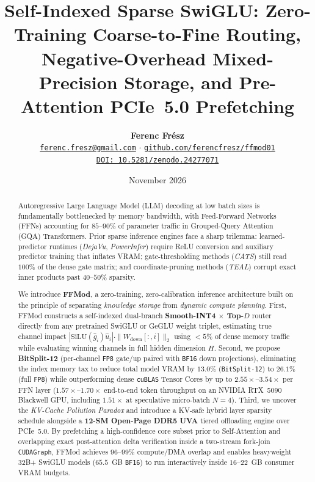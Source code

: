 \documentclass[10pt,twocolumn]{article}
\title{\Large\bfseries Self-Indexed Sparse SwiGLU: Zero-Training Coarse-to-Fine Routing,\\Negative-Overhead Mixed-Precision Storage, and Pre-Attention PCIe~5.0 Prefetching}
\author{
  \textbf{Ferenc Frész}\\
  \href{mailto:ferenc.fresz@gmail.com}{\texttt{ferenc.fresz@gmail.com}} $\cdot$ \href{https://github.com/ferencfresz/ffmod01}{\texttt{github.com/ferencfresz/ffmod01}}\\
  \href{https://doi.org/10.5281/zenodo.24277071}{\texttt{DOI: 10.5281/zenodo.24277071}}
}
\date{November 2026}
\begin{document}
\maketitle

\begin{abstract}
Autoregressive Large Language Model (LLM) decoding at low batch sizes is fundamentally bottlenecked by memory bandwidth, with Feed-Forward Networks (FFNs) accounting for $85\text{--}90\%$ of parameter traffic in Grouped-Query Attention (GQA) Transformers. Prior sparse inference engines face a sharp trilemma: learned-predictor runtimes (\emph{DejaVu}, \emph{PowerInfer}) require ReLU conversion and auxiliary predictor training that inflates VRAM; gate-thresholding methods (\emph{CATS}) still read $100\%$ of the dense gate matrix; and coordinate-pruning methods (\emph{TEAL}) corrupt exact inner products past $40\text{--}50\%$ sparsity.

We introduce \textbf{FFMod}, a zero-training, zero-calibration inference architecture built on the principle of separating \emph{knowledge storage} from \emph{dynamic compute planning}. First, FFMod constructs a self-indexed dual-branch \textbf{Smooth-INT4 $\times$ Top-$D$} router directly from any pretrained SwiGLU or GeGLU weight triplet, estimating true channel impact $|\mathrm{SiLU}(\hat{g}_i)\hat{u}_i|\cdot\|W_{\mathrm{down}}[:,i]\|_2$ using $<5\%$ of dense memory traffic while evaluating winning channels in full hidden dimension $H$. Second, we propose \textbf{BitSplit-12} (per-channel \texttt{FP8} gate/up paired with \texttt{BF16} down projections), eliminating the index memory tax to reduce total model VRAM by $13.0\%$ (\texttt{BitSplit-12}) to $26.1\%$ (full \texttt{FP8}) while outperforming dense \texttt{cuBLAS} Tensor Cores by up to $2.55\times\text{--}3.54\times$ per FFN layer ($1.57\times\text{--}1.70\times$ end-to-end token throughput on an NVIDIA RTX~5090 Blackwell GPU, including $1.51\times$ at speculative micro-batch $N=4$). Third, we uncover the \emph{KV-Cache Pollution Paradox} and introduce a KV-safe hybrid layer sparsity schedule alongside a \textbf{12-SM Open-Page DDR5 UVA} tiered offloading engine over PCIe~5.0. By prefetching a high-confidence core subset prior to Self-Attention and overlapping exact post-attention delta verification inside a two-stream fork-join \texttt{CUDAGraph}, FFMod achieves $96\text{--}99\%$ compute/DMA overlap and enables heavyweight 32B+ SwiGLU models ($65.5$~GB \texttt{BF16}) to run interactively inside $16\text{--}22$~GB consumer VRAM budgets.
\end{abstract}
\end{document}
